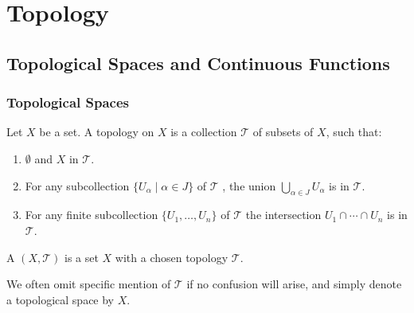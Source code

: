 \part{Topology}
\chapter{Topological Spaces and Continuous Functions}
\section{Topological Spaces}
\begin{definition}
Let $X$ be a set. A topology on $X$ is a collection $\mathscr{T}$ of subsets of $X$, such that:
\begin{enumerate}[label=(\arabic*)]
\item $\emptyset$ and $X$ in $\mathscr{T}$.
\item For any subcollection $\{U_\alpha\mid\alpha\in J\}$ of $\mathscr{T}$ , the union $\bigcup_{\alpha\in J}U_\alpha$ is in $\mathscr{T}$.
\item For any finite subcollection $\{U_1,\dots,U_n\}$ of $\mathscr{T}$ the intersection $U_1\cap\cdots\cap U_n$ is in $\mathscr{T}$.
\end{enumerate}
A  $(X,\mathscr{T})$ is a set $X$ with a chosen topology $\mathscr{T}$.
\end{definition}

\begin{notation}
We often omit specific mention of $\mathscr{T}$ if no confusion will arise, and simply denote a topological space by $X$.
\end{notation}
